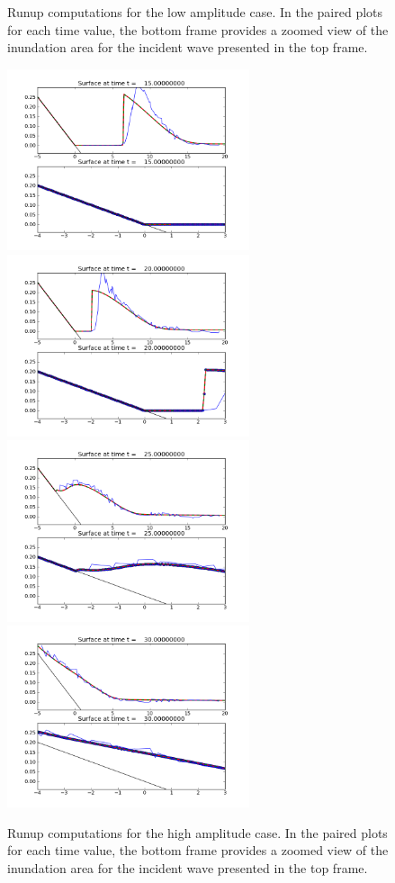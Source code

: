 \begin{figure}[ht]
\caption{\label{bp2framesa} 
Runup computations for the low amplitude case. In the paired plots for each time value, the bottom frame provides a zoomed view of the inundation area for the incident wave presented in the top frame.
}
\end{figure}

\begin{figure}[ht]
\hfil\includegraphics[width=2.8in]{bp4/lab-3/frame0001fig2.png}\hfil
\hfil\includegraphics[width=2.8in]{bp4/lab-3/frame0002fig2.png}\hfil
\vskip 5pt
\hfil\includegraphics[width=2.8in]{bp4/lab-3/frame0003fig2.png}\hfil
\hfil\includegraphics[width=2.8in]{bp4/lab-3/frame0004fig2.png}\hfil
\caption{\label{bp2framesb} 
Runup computations for the high amplitude case. In the paired plots for each time value, the bottom frame provides a zoomed view of the inundation area for the incident wave presented in the top frame.
}
\end{figure}

